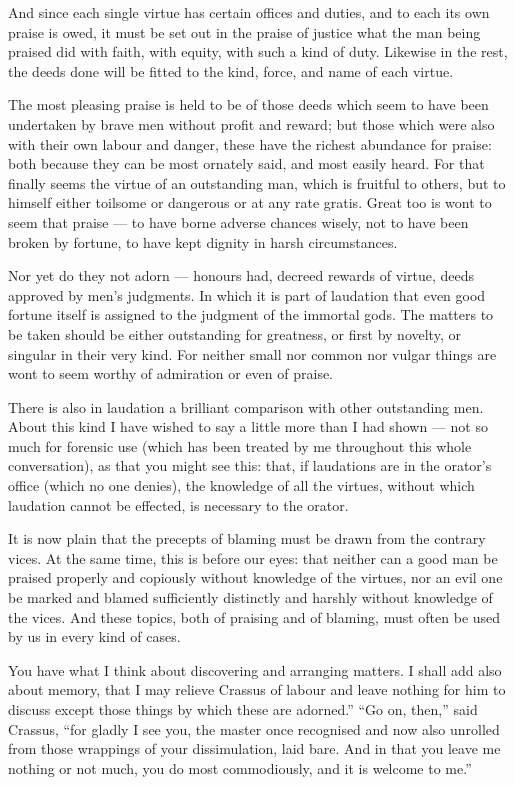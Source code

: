  And since each single virtue has certain offices and duties, and to each its own praise is owed, it must be set out in the praise of justice what the man being praised did with faith, with equity, with such a kind of duty. Likewise in the rest, the deeds done will be fitted to the kind, force, and name of each virtue.

 The most pleasing praise is held to be of those deeds which seem to have been undertaken by brave men without profit and reward; but those which were also with their own labour and danger, these have the richest abundance for praise: both because they can be most ornately said, and most easily heard. For that finally seems the virtue of an outstanding man, which is fruitful to others, but to himself either toilsome or dangerous or at any rate gratis. Great too is wont to seem that praise — to have borne adverse chances wisely, not to have been broken by fortune, to have kept dignity in harsh circumstances.

 Nor yet do they not adorn — honours had, decreed rewards of virtue, deeds approved by men's judgments. In which it is part of laudation that even good fortune itself is assigned to the judgment of the immortal gods. The matters to be taken should be either outstanding for greatness, or first by novelty, or singular in their very kind. For neither small nor common nor vulgar things are wont to seem worthy of admiration or even of praise.

 There is also in laudation a brilliant comparison with other outstanding men. About this kind I have wished to say a little more than I had shown — not so much for forensic use (which has been treated by me throughout this whole conversation), as that you might see this: that, if laudations are in the orator's office (which no one denies), the knowledge of all the virtues, without which laudation cannot be effected, is necessary to the orator.

 It is now plain that the precepts of blaming must be drawn from the contrary vices. At the same time, this is before our eyes: that neither can a good man be praised properly and copiously without knowledge of the virtues, nor an evil one be marked and blamed sufficiently distinctly and harshly without knowledge of the vices. And these topics, both of praising and of blaming, must often be used by us in every kind of cases.

 You have what I think about discovering and arranging matters. I shall add also about memory, that I may relieve Crassus of labour and leave nothing for him to discuss except those things by which these are adorned.'' ``Go on, then,'' said Crassus, ``for gladly I see you, the master once recognised and now also unrolled from those wrappings of your dissimulation, laid bare. And in that you leave me nothing or not much, you do most commodiously, and it is welcome to me.''

